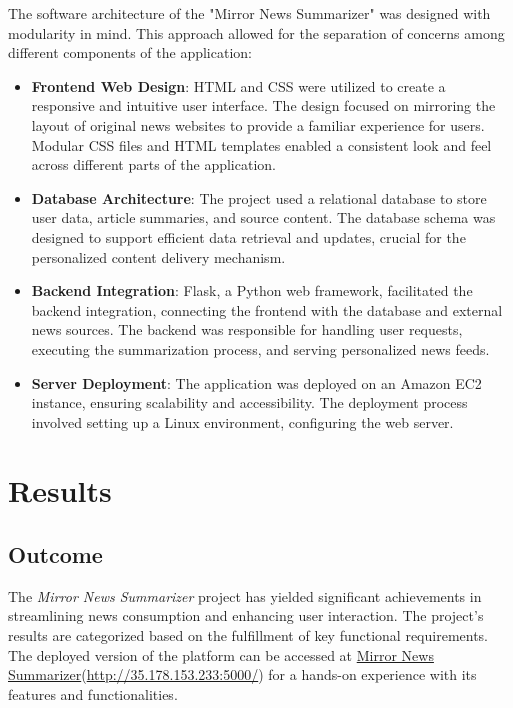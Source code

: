 \documentclass[10pt]{article}
\begin{document}
The software architecture of the "Mirror News Summarizer" was designed with modularity in mind. This approach allowed for the separation of concerns among different components of the application:

\begin{itemize}
    \item \textbf{Frontend Web Design}: HTML and CSS were utilized to create a responsive and intuitive user interface. The design focused on mirroring the layout of original news websites to provide a familiar experience for users. Modular CSS files and HTML templates enabled a consistent look and feel across different parts of the application.
    \item \textbf{Database Architecture}: The project used a relational database to store user data, article summaries, and source content. The database schema was designed to support efficient data retrieval and updates, crucial for the personalized content delivery mechanism.
    \item \textbf{Backend Integration}: Flask, a Python web framework, facilitated the backend integration, connecting the frontend with the database and external news sources. The backend was responsible for handling user requests, executing the summarization process, and serving personalized news feeds.
    \item \textbf{Server Deployment}: The application was deployed on an Amazon EC2 instance, ensuring scalability and accessibility. The deployment process involved setting up a Linux environment, configuring the web server.
\end{itemize}

\section{Results}

\subsection{Outcome}

The \textit{Mirror News Summarizer} project has yielded significant achievements in streamlining news consumption and enhancing user interaction. The project's results are categorized based on the fulfillment of key functional requirements. The deployed version of the platform can be accessed at \href{http://35.178.153.233:5000/}{Mirror News Summarizer}(\href{http://35.178.153.233:5000/}{http://35.178.153.233:5000/}) for a hands-on experience with its features and functionalities.
\end{document}
